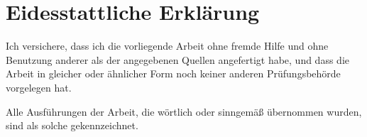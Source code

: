 \clearpage
\section{Eidesstattliche Erklärung}
Ich versichere, dass ich die vorliegende Arbeit ohne fremde Hilfe und ohne Benutzung anderer
als der angegebenen Quellen angefertigt habe, und dass die Arbeit in gleicher oder ähnlicher
Form noch keiner anderen Prüfungsbehörde vorgelegen hat.

Alle Ausführungen der Arbeit, die wörtlich oder sinngemäß übernommen wurden, sind als solche
gekennzeichnet.

\vspace{1em}

\makeatother


